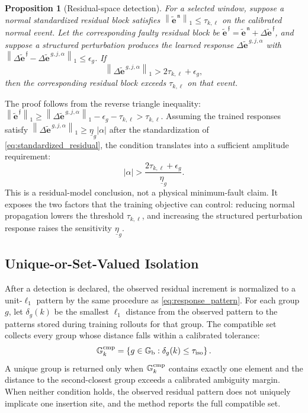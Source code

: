 \documentclass[journal]{IEEEtran}
\newtheorem{proposition}{Proposition}
\newcommand{\norm}[1]{\left\lVert #1\right\rVert}
\newcommand{\abs}[1]{\left\lvert #1\right\rvert}
\newcommand{\1}{\bm 1}
\begin{document}
\begin{proposition}[Residual-space detection]
\label{prop:detection}
For a selected window, suppose a normal standardized residual block satisfies
$\norm{\widetilde{\bm e}^{\,\mathfrak n}}_1\leq\tau_{k,\ell}$ on the
calibrated normal event. Let the corresponding faulty residual block be
$\widetilde{\bm e}^{\,\mathfrak f}
=\widetilde{\bm e}^{\,\mathfrak n}
+\Delta\widetilde{\bm e}^{\,\mathfrak f}$, and suppose a structured
perturbation produces the learned response
$\Delta\widetilde{\bm e}^{\,g,j,\alpha}$ with
$\norm{\Delta\widetilde{\bm e}^{\,\mathfrak f}
-\Delta\widetilde{\bm e}^{\,g,j,\alpha}}_1\leq\epsilon_g$. If
\begin{equation}
\norm{\Delta\widetilde{\bm e}^{\,g,j,\alpha}}_1
>2\tau_{k,\ell}+\epsilon_g,
\label{eq:detection_condition}
\end{equation}
then the corresponding residual block exceeds $\tau_{k,\ell}$ on that event.
\end{proposition}

The proof follows from the reverse triangle inequality:
$\norm{\widetilde{\bm e}^{\,\mathfrak f}}_1
\geq\norm{\Delta\widetilde{\bm e}^{\,g,j,\alpha}}_1
-\epsilon_g-\tau_{k,\ell}
>\tau_{k,\ell}$. Assuming the trained responses satisfy $\norm{\Delta\widetilde{\bm
e}^{\,g,j,\alpha}}_1 \geq\underline{\eta}_g\abs{\alpha}$ after the
standardization of \eqref{eq:standardized_residual}, the condition translates
into a sufficient amplitude requirement:
\begin{equation}
\abs{\alpha}>
\frac{2\tau_{k,\ell}+\epsilon_g}{\underline{\eta}_g}.
\label{eq:amplitude_condition}
\end{equation}
This is a residual-model conclusion, not a physical minimum-fault claim. It
exposes the two factors that the training objective can control: reducing
normal propagation lowers the threshold $\tau_{k,\ell}$, and increasing the
structured perturbation response raises the sensitivity $\underline{\eta}_g$.

\subsection{Unique-or-Set-Valued Isolation}
After a detection is declared, the observed residual increment is normalized
to a unit-$\ell_1$ pattern by the same procedure as
\eqref{eq:response_pattern}. For each group $g$, let $\delta_g(k)$ be the
smallest $\ell_1$ distance from the observed pattern to the patterns stored
during training rollouts for that group. The compatible set collects every
group whose distance falls within a calibrated tolerance:
\begin{equation}
\mathbb G_k^{\rm cmp}=
\left\{g\in\mathbb G_{\rm b}:
\delta_g(k)\leq\tau_{\rm iso}\right\}.
\label{eq:candidate_set}
\end{equation}
A unique group is returned only when $\mathbb G_k^{\rm cmp}$ contains exactly
one element and the distance to the second-closest group exceeds a calibrated
ambiguity margin. When neither condition holds, the observed residual pattern
does not uniquely implicate one insertion site, and the method reports the
full compatible set.
\end{document}
